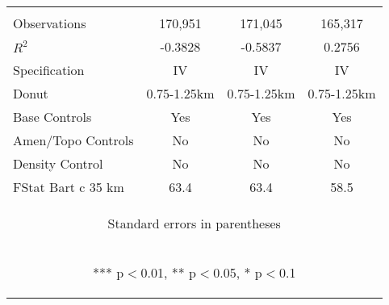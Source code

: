 \begin{tabular}{lccc}
\vspace{4pt} & \begin{footnotesize}\end{footnotesize} & \begin{footnotesize}\end{footnotesize} & \begin{footnotesize}\end{footnotesize} \\
Observations & 170,951 & 171,045 & 165,317 \\
$R^2$ & -0.3828 & -0.5837 & 0.2756 \\
Specification & IV & IV & IV \\
Donut & 0.75-1.25km & 0.75-1.25km & 0.75-1.25km \\
Base Controls & Yes & Yes & Yes \\
Amen/Topo Controls & No & No & No \\
Density Control & No & No & No \\
 FStat Bart c 35 km & 63.4 & 63.4 & 58.5 \\ \hline
\multicolumn{4}{c}{\begin{footnotesize} Standard errors in parentheses\end{footnotesize}} \\
\multicolumn{4}{c}{\begin{footnotesize} *** p$<$0.01, ** p$<$0.05, * p$<$0.1\end{footnotesize}} \\
\end{tabular}

